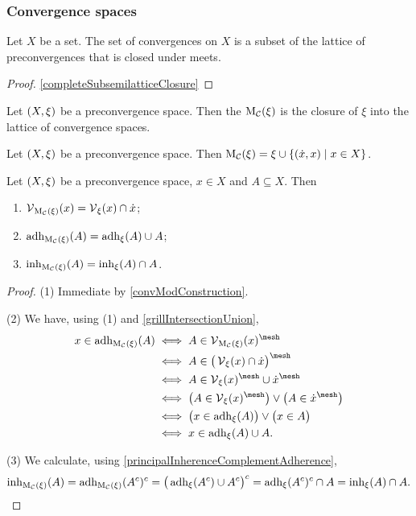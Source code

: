 \subsubsection{Convergence spaces}
\begin{lemma}
Let $X$ be a set. The set of convergences on $X$ is a subset of the lattice of preconvergences that is closed under meets.
\end{lemma}
\begin{proof}
\ref{completeSubsemilatticeClosure}
\end{proof}

\begin{definition}
Let $\left( X,\xi \right)$ be a preconvergence space. Then the  $\operatorname{M_\mathcal{C}}(\xi)$ is the closure of $\xi$ into the lattice of convergence spaces.
\end{definition}

\begin{lemma} \label{convModConstruction}
Let $\left( X,\xi \right)$ be a preconvergence space. Then $\convMod(\xi) = \xi \cup \setbuilder{(\pfilter{x}, x)}{x\in X}$.
\end{lemma}

\begin{proposition} \label{vicinitiesConvergenceModification}
Let $\left( X,\xi \right)$ be a preconvergence space, $x\in X$ and $A\subseteq X$. Then
\begin{enumerate}
\item $\operatorname{\mathcal{V}}_{\operatorname{M_\mathcal{C}}(\xi)}(x) = \operatorname{\mathcal{V}}_{\xi}(x)\cap \dot{x}$;
\item $\operatorname{adh}_{\operatorname{M_\mathcal{C}}(\xi)}(A) = \operatorname{adh}_\xi(A) \cup A$;
\item $\operatorname{inh}_{\operatorname{M_\mathcal{C}}(\xi)}(A) = \operatorname{inh}_\xi(A) \cap A$.
\end{enumerate}
\end{proposition}
\begin{proof}
(1) Immediate by \ref{convModConstruction}.

(2) We have, using (1) and \ref{grillIntersectionUnion},
\begin{align*}
x\in \adh_{\convMod(\xi)}(A) &\iff A\in \vicinity_{\convMod(\xi)}(x)^\mesh \\
&\iff A\in \big(\vicinity_{\xi}(x) \cap \pfilter{x}\big)^\mesh \\
&\iff A\in \vicinity_{\xi}(x)^\mesh \cup \pfilter{x}^\mesh \\
&\iff \big(A\in \vicinity_{\xi}(x)^\mesh\big) \lor \big(A\in \pfilter{x}^\mesh\big) \\
&\iff \big(x\in \adh_\xi(A)\big) \lor \big(x\in A\big) \\
&\iff x \in \adh_\xi(A) \cup A.
\end{align*}

(3) We calculate, using \ref{principalInherenceComplementAdherence},
\[ \operatorname{inh}_{\operatorname{M_\mathcal{C}}(\xi)}(A) = \operatorname{adh}_{\operatorname{M_\mathcal{C}}(\xi)}(A^c)^c = \big(\operatorname{adh}_\xi(A^c)\cup A^c\big)^c = \operatorname{adh}_\xi(A^c)^c \cap A = \operatorname{inh}_\xi(A) \cap A. \]
\end{proof}

